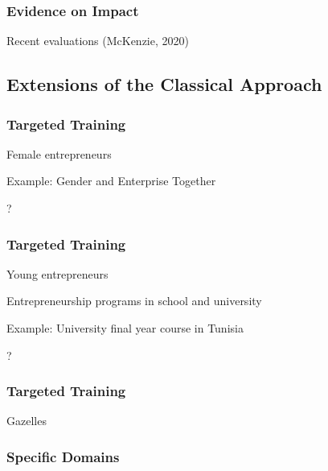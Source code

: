 \documentclass[hideothersubsections, usenames,dvipsnames,11pt]{beamer}
\newenvironment{itemize_3pt}{\itemize\addtolength{\itemsep}{3pt}}{\enditemize}
\begin{document}
\begin{frame}
\frametitle{Evidence on Impact}
	\begin{itemize_3pt}
	\item Recent evaluations (McKenzie, 2020) \citep{McKenzie2020}
	\vspace{0.1in}
	\end{itemize_3pt}
\end{frame}


\subsection{Extensions of the Classical Approach}

\begin{frame}
\frametitle{Targeted Training}
	Female entrepreneurs
	\begin{itemize_3pt}
		\item Example: Gender and Enterprise Together \citep[GET Ahead, ILO;][]{Bulte2016,McKenziePuerto2020}
		\item ?
	\vspace{0.1in}
	\end{itemize_3pt}
\end{frame}

\begin{frame}
\frametitle{Targeted Training}
	Young entrepreneurs
	\begin{itemize_3pt}
		\item Entrepreneurship programs in school and university
		\item Example: University final year course in Tunisia \citep{Alaref2020}
		\item ?
	\vspace{0.1in}
	\end{itemize_3pt}
\end{frame}

\begin{frame}
\frametitle{Targeted Training}
	\begin{itemize_3pt}
	\item Gazelles
	\vspace{0.1in}
	\end{itemize_3pt}
\end{frame}


\begin{frame}
\frametitle{Specific Domains}
	\begin{itemize_3pt}
	\item \citep{Anderson2018}
	\vspace{0.1in}
	\end{itemize_3pt}
\end{frame}
\end{document}
